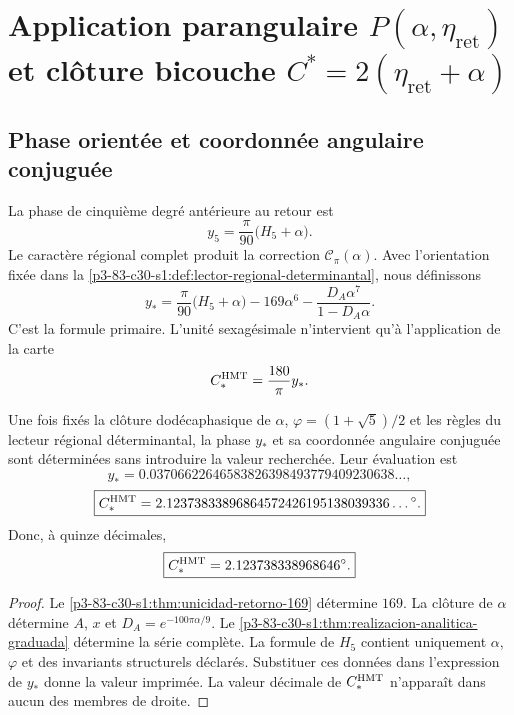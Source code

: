 \section{Application parangulaire \texorpdfstring{\(P(\alpha,\eta_{\mathrm{ret}})\)}{P(alpha,eta_ret)} et clôture bicouche \texorpdfstring{\(C^*=2(\eta_{\mathrm{ret}}+\alpha)\)}{C*=2(eta_ret+alpha)}}
\label{sec:s102:c38:4}

\subsection{Phase orientée et coordonnée angulaire conjuguée}
\label{sec:s102:c38:4:1}


La phase de cinquième degré antérieure au retour est
\[
y_5=\frac\pi{90}\bigl(H_5+\alpha\bigr).
\]
Le caractère régional complet produit la correction
\(\mathscr C_\pi(\alpha)\). Avec l'orientation fixée dans la
\cref{p3-83-c30-s1:def:lector-regional-determinantal}, nous définissons
\[
\boxed{
y_*=\frac\pi{90}\bigl(H_5+\alpha\bigr)
-169\alpha^6
-\frac{D_A\alpha^7}{1-D_A\alpha}.}
\]
C'est la formule primaire. L'unité sexagésimale n'intervient qu'à l'application de la carte
\[
C_*^{\rm HMT}=\frac{180}{\pi}y_*.
\]

\begin{theorem}
\label{p3-83-c30-s1:thm:contraangulo-regional}
Une fois fixés la clôture dodécaphasique de \(\alpha\),
\(\varphi=(1+\sqrt5)/2\) et les règles du lecteur régional déterminantal, la
phase \(y_*\) et sa coordonnée angulaire conjuguée sont déterminées sans introduire la valeur
recherchée. Leur évaluation est
\[
\boxed{
y_*=0.03706622646583826398493779409230638\ldots,}
\]
\[
\boxed{
C_*^{\rm HMT}
=2.12373833896864572426195138039336\ldots{}^\circ.}
\]
Donc, à quinze décimales,
\[
\boxed{C_*^{\rm HMT}=2.123738338968646^\circ.}
\]
\end{theorem}

\begin{proof}
Le \cref{p3-83-c30-s1:thm:unicidad-retorno-169} détermine \(169\). La clôture de
\(\alpha\) détermine \(A\), \(x\) et
\(D_A=e^{-100\pi\alpha/9}\). Le \cref{p3-83-c30-s1:thm:realizacion-analitica-graduada}
détermine la série complète. La formule de \(H_5\) contient uniquement
\(\alpha\), \(\varphi\) et des invariants structurels déclarés. Substituer
ces données dans l'expression de \(y_*\) donne la valeur imprimée. La valeur décimale
de \(C_*^{\rm HMT}\) n'apparaît dans aucun des membres de droite.
\end{proof}

